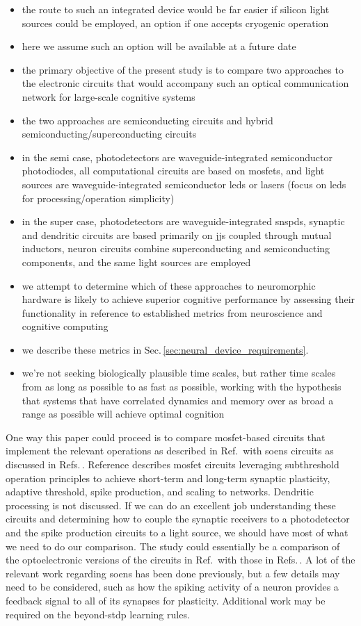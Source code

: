 \documentclass[twocolumn]{article}
\begin{document}
\begin{itemize}
\item the route to such an integrated device would be far easier if silicon light sources could be employed, an option if one accepts cryogenic operation
\item here we assume such an option will be available at a future date
\item the primary objective of the present study is to compare two approaches to the electronic circuits that would accompany such an optical communication network for large-scale cognitive systems
\item the two approaches are semiconducting circuits and hybrid semiconducting/superconducting circuits
\item in the semi case, photodetectors are waveguide-integrated semiconductor photodiodes, all computational circuits are based on mosfets, and light sources are waveguide-integrated semiconductor leds or lasers (focus on leds for processing/operation simplicity)
\item in the super case, photodetectors are waveguide-integrated snspds, synaptic and dendritic circuits are based primarily on jjs coupled through mutual inductors, neuron circuits combine superconducting and semiconducting components, and the same light sources are employed
\item we attempt to determine which of these approaches to neuromorphic hardware is likely to achieve superior cognitive performance by assessing their functionality in reference to established metrics from neuroscience and cognitive computing
\item we describe these metrics in Sec.\,\ref{sec:neural_device_requirements}.
\item we're not seeking biologically plausible time scales, but rather time scales from as long as possible to as fast as possible, working with the hypothesis that systems that have correlated dynamics and memory over as broad a range as possible will achieve optimal cognition
\end{itemize}

One way this paper could proceed is to compare mosfet-based circuits that implement the relevant operations as described in Ref.\,\cite{chst2014} with soens circuits as discussed in Refs.\,\cite{shbu2019,sh2020}. Reference \cite{chst2014} describes mosfet circuits leveraging subthreshold operation principles to achieve short-term and long-term synaptic plasticity, adaptive threshold, spike production, and scaling to networks. Dendritic processing is not discussed. If we can do an excellent job understanding these circuits and determining how to couple the synaptic receivers to a photodetector and the spike production circuits to a light source, we should have most of what we need to do our comparison. The study could essentially be a comparison of the optoelectronic versions of the circuits in Ref.\,\cite{chst2014} with those in Refs.\,\cite{shbu2019,sh2020}. A lot of the relevant work regarding soens has been done previously, but a few details may need to be considered, such as how the spiking activity of a neuron provides a feedback signal to all of its synapses for plasticity. Additional work may be required on the beyond-stdp learning rules.
\end{document}

